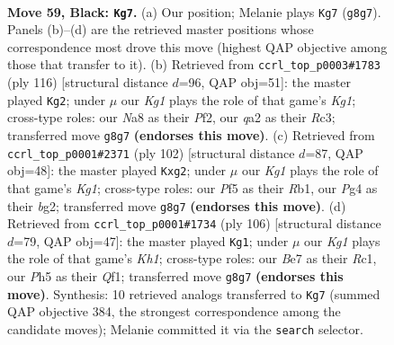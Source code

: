 \documentclass[11pt]{article}
\begin{document}
\clearpage

\begin{figure}[p]\centering
\begin{subfigure}{0.46\textwidth}\centering
\resizebox{\linewidth}{!}{%
\newchessgame
\chessboard[
  setfen={n5k1/3qbr2/8/Prp2p1p/3p1Pp1/8/QRRBP2P/3N2K1 b - - 1 59},
  showmover=false,
  pgfstyle=straightmove, color=movearrow, markmove={g8-g7}
]}
\caption{}
\end{subfigure}\hfill
\begin{subfigure}{0.46\textwidth}\centering
\resizebox{\linewidth}{!}{%
\newchessgame
\chessboard[
  setfen={2r4k/p5p1/4p2p/1qr5/2pRP2P/2R3P1/P3QP2/6K1 w - - 31 59},
  showmover=false,
  pgfstyle=straightmove, color=movearrow, markmove={g1-g2}
]}
\caption{}
\end{subfigure}
\\[4pt]
\begin{subfigure}{0.46\textwidth}\centering
\resizebox{\linewidth}{!}{%
\newchessgame
\chessboard[
  setfen={1q1rr1k1/5pp1/1p5p/1Q2P3/P2p3P/1P1R2P1/5Pb1/1R4K1 w - - 0 52},
  showmover=false,
  pgfstyle=straightmove, color=movearrow, markmove={g1-g2}
]}
\caption{}
\end{subfigure}\hfill
\begin{subfigure}{0.46\textwidth}\centering
\resizebox{\linewidth}{!}{%
\newchessgame
\chessboard[
  setfen={6k1/3q2p1/2rrpp1p/8/p2P4/PbB1RP1P/1P4P1/2R2Q1K w - - 16 54},
  showmover=false,
  pgfstyle=straightmove, color=movearrow, markmove={h1-g1}
]}
\caption{}
\end{subfigure}
\caption{\textbf{Move 59, Black: \texttt{Kg7}.} (a) Our position; Melanie plays \texttt{Kg7} (\texttt{g8g7}). Panels (b)--(d) are the retrieved master positions whose correspondence most drove this move (highest QAP objective among those that transfer to it). (b) Retrieved from \texttt{ccrl\_top\_p0003\#1783} (ply 116) [structural distance $d$=96, QAP obj=51]: the master played \texttt{Kg2}; under $\mu$ our \emph{Kg1} plays the role of that game's \emph{Kg1}; cross-type roles: our \emph{N}a8 as their \emph{P}f2, our \emph{q}a2 as their \emph{R}c3; transferred move \texttt{g8g7} \textbf{(endorses this move)}. (c) Retrieved from \texttt{ccrl\_top\_p0001\#2371} (ply 102) [structural distance $d$=87, QAP obj=48]: the master played \texttt{Kxg2}; under $\mu$ our \emph{Kg1} plays the role of that game's \emph{Kg1}; cross-type roles: our \emph{P}f5 as their \emph{R}b1, our \emph{P}g4 as their \emph{b}g2; transferred move \texttt{g8g7} \textbf{(endorses this move)}. (d) Retrieved from \texttt{ccrl\_top\_p0001\#1734} (ply 106) [structural distance $d$=79, QAP obj=47]: the master played \texttt{Kg1}; under $\mu$ our \emph{Kg1} plays the role of that game's \emph{Kh1}; cross-type roles: our \emph{B}e7 as their \emph{R}c1, our \emph{P}h5 as their \emph{Q}f1; transferred move \texttt{g8g7} \textbf{(endorses this move)}. Synthesis: 10 retrieved analogs transferred to \texttt{Kg7} (summed QAP objective 384, the strongest correspondence among the candidate moves); Melanie committed it via the \texttt{search} selector.}
\label{fig:thought-m117}
\end{figure}
\end{document}
